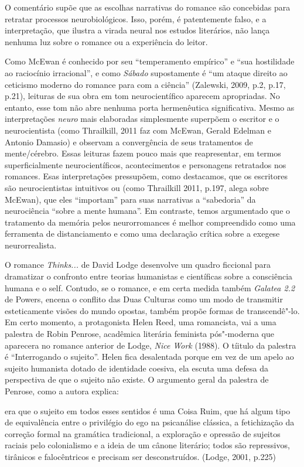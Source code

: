 O comentário supõe que as escolhas narrativas do romance são concebidas
para retratar processos neurobiológicos. Isso, porém, é patentemente
falso, e a interpretação, que ilustra a virada neural nos estudos
literários, não lança nenhuma luz sobre o romance ou a experiência do
leitor.

Como McEwan é conhecido por seu ``temperamento empírico'' e ``sua
hostilidade ao raciocínio irracional'', e como \emph{Sábado}
supostamente é ``um ataque direito ao ceticismo moderno do romance para
com a ciência'' (Zalewski, 2009, p.2, p.17, p.21), leituras de sua obra
em tom neurocientífico aparecem apropriadas. No entanto, esse tom não
abre nenhuma porta hermenêutica significativa. Mesmo as interpretações
\emph{neuro} mais elaboradas simplesmente superpõem o escritor e o
neurocientista (como Thrailkill, 2011 faz com McEwan, Gerald Edelman e
Antonio Damasio) e observam a convergência de seus tratamentos de
mente/cérebro. Essas leituras fazem pouco mais que reapresentar, em
termos superficialmente neurocientíficos, acontecimentos e personagens
retratados nos romances. Esas interpretações pressupõem, como
destacamos, que os escritores são neurocientistas intuitivos ou (como
Thrailkill 2011, p.197, alega sobre McEwan), que eles ``importam'' para
suas narrativas a ``sabedoria'' da neurociência ``sobre a mente
humana''. Em contraste, temos argumentado que o tratamento da memória
pelos neurorromances é melhor compreendido como uma ferramenta de
distanciamento e como uma declaração crítica sobre a exegese
neurorrealista.

O romance \emph{Thinks...} de David Lodge desenvolve um quadro ficcional
para dramatizar o confronto entre teorias humanistas e científicas sobre
a consciência humana e o self. Contudo, se o romance, e em certa medida
também \emph{Galatea 2.2} de Powers, encena o conflito das Duas Culturas
como um modo de transmitir esteticamente visões do mundo opostas, também
propõe formas de transcendê"-lo. Em certo momento, a protagonista Helen
Reed, uma romancista, vai a uma palestra de Robin Penrose, acadêmica
literária feminista pós"-moderna que aparecera no romance anterior de
Lodge, \emph{Nice Work} (1988). O tíitulo da palestra é ``Interrogando o
sujeito''. Helen fica desalentada porque em vez de um apelo ao sujeito
humanista dotado de identidade coesiva, ela escuta uma defesa da
perspectiva de que o sujeito não existe. O argumento geral da palestra
de Penrose, como a autora explica:

era que o sujeito em todos esses sentidos é uma Coisa Ruim, que há algum
tipo de equivalência entre o privilégio do ego na psicanálise clássica,
a fetichização da correção formal na gramática tradicional, a exploração
e opressão de sujeitos raciais pelo colonialismo e a ideia de um cânone
literário; todos são repressivos, tirânicos e falocêntricos e precisam
ser desconstruídos. (Lodge, 2001, p.225)

